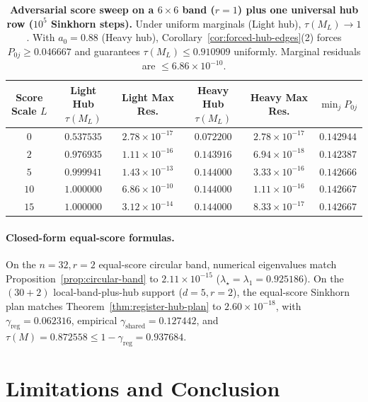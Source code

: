 \documentclass[10pt]{article}
\begin{document}
\begin{table}[t]
  \centering
  \small
  \caption{\textbf{Adversarial score sweep on a $6\times 6$ band ($r=1$) plus one universal hub row ($10^5$ Sinkhorn steps).} Under uniform marginals (Light hub), $\tau(M_L) \to 1$. With $a_0 = 0.88$ (Heavy hub), Corollary~\ref{cor:forced-hub-edges}(2) forces $P_{0j} \ge 0.046667$ and guarantees $\tau(M_L) \le 0.910909$ uniformly. Marginal residuals are $\le 6.86 \times 10^{-10}$.}
  \label{tab:face-stress}
  \begin{tabular}{@{}cccccc@{}}
    \toprule
    Score Scale $L$ & Light Hub $\tau(M_L)$ & Light Max Res. & Heavy Hub $\tau(M_L)$ & Heavy Max Res. & $\min_j P_{0j}$ \\
    \midrule
    $0$  & $0.537535$ & $2.78 \times 10^{-17}$ & $0.072200$ & $2.78 \times 10^{-17}$ & $0.142944$ \\
    $2$  & $0.976935$ & $1.11 \times 10^{-16}$ & $0.143916$ & $6.94 \times 10^{-18}$ & $0.142387$ \\
    $5$  & $0.999941$ & $1.43 \times 10^{-13}$ & $0.144000$ & $3.33 \times 10^{-16}$ & $0.142666$ \\
    $10$ & $1.000000$ & $6.86 \times 10^{-10}$ & $0.144000$ & $1.11 \times 10^{-16}$ & $0.142667$ \\
    $15$ & $1.000000$ & $3.12 \times 10^{-14}$ & $0.144000$ & $8.33 \times 10^{-17}$ & $0.142667$ \\
    \bottomrule
  \end{tabular}
\end{table}

\paragraph{Closed-form equal-score formulas.}
On the $n=32, r=2$ equal-score circular band, numerical eigenvalues match Proposition~\ref{prop:circular-band} to $2.11 \times 10^{-15}$ ($\lambda_\star = \lambda_1 = 0.925186$). On the $(30+2)$ local-band-plus-hub support ($d=5, r=2$), the equal-score Sinkhorn plan matches Theorem~\ref{thm:register-hub-plan} to $2.60 \times 10^{-18}$, with $\gamma_{\mathrm{reg}} = 0.062316$, empirical $\gamma_{\mathrm{shared}} = 0.127442$, and $\tau(M) = 0.872558 \le 1 - \gamma_{\mathrm{reg}} = 0.937684$.

\section{Limitations and Conclusion}
\label{sec:conclusion}
\end{document}
